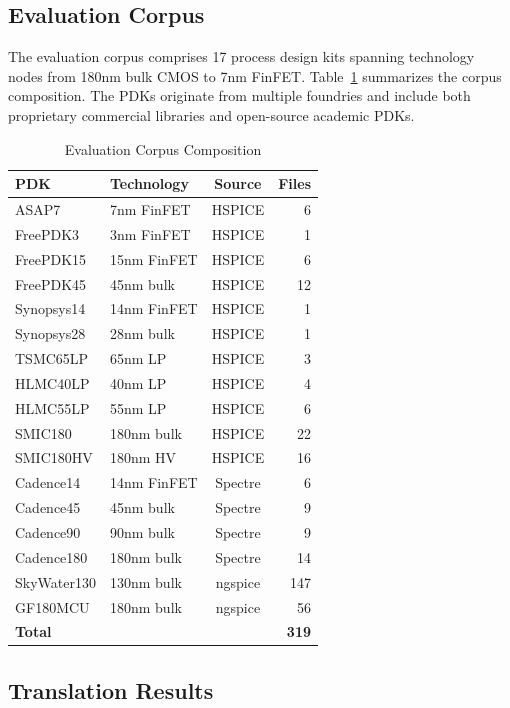 \documentclass[conference]{IEEEtran}
\begin{document}
\subsection{Evaluation Corpus}

The evaluation corpus comprises 17 process design kits spanning technology nodes from 180nm bulk CMOS to 7nm FinFET. Table~\ref{tab:corpus} summarizes the corpus composition. The PDKs originate from multiple foundries and include both proprietary commercial libraries and open-source academic PDKs.

\begin{table}[!t]
\caption{Evaluation Corpus Composition}
\label{tab:corpus}
\centering
\renewcommand{\arraystretch}{1.15}
\begin{tabular}{@{}llcr@{}}
\toprule
\textbf{PDK} & \textbf{Technology} & \textbf{Source} & \textbf{Files} \\
\midrule
ASAP7 & 7nm FinFET & HSPICE & 6 \\
FreePDK3 & 3nm FinFET & HSPICE & 1 \\
FreePDK15 & 15nm FinFET & HSPICE & 6 \\
FreePDK45 & 45nm bulk & HSPICE & 12 \\
Synopsys14 & 14nm FinFET & HSPICE & 1 \\
Synopsys28 & 28nm bulk & HSPICE & 1 \\
TSMC65LP & 65nm LP & HSPICE & 3 \\
HLMC40LP & 40nm LP & HSPICE & 4 \\
HLMC55LP & 55nm LP & HSPICE & 6 \\
SMIC180 & 180nm bulk & HSPICE & 22 \\
SMIC180HV & 180nm HV & HSPICE & 16 \\
Cadence14 & 14nm FinFET & Spectre & 6 \\
Cadence45 & 45nm bulk & Spectre & 9 \\
Cadence90 & 90nm bulk & Spectre & 9 \\
Cadence180 & 180nm bulk & Spectre & 14 \\
SkyWater130 & 130nm bulk & ngspice & 147 \\
GF180MCU & 180nm bulk & ngspice & 56 \\
\midrule
\textbf{Total} & & & \textbf{319} \\
\bottomrule
\end{tabular}
\end{table}

\subsection{Translation Results}
\end{document}
